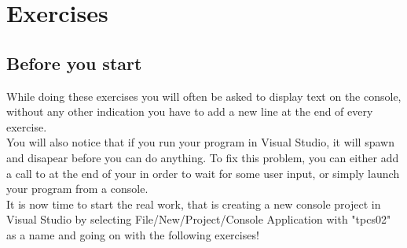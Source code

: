\section{Exercises}

\subsection{Before you start}
While doing these exercises you will often be asked to display text on the console,
without any other indication you have to add a new line at the end of every exercise.\\
You will also notice that if you run your program in Visual Studio,
it will spawn and disapear before you can do anything.
To fix this problem, you can either add a call to  at the end of your  in
order to wait for some user input, or simply launch your program from a console.\\

It is now time to start the real work, that is creating a new console project in Visual Studio
by selecting File/New/Project/Console Application with "tpcs02" as a name and going on
with the following exercises!
















